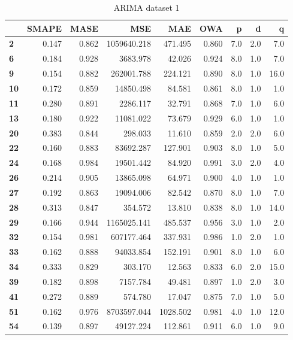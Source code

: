 \begin{table}[ht]
  \centering
  \caption{ARIMA dataset 1}
  \label{table:experiment_arima_dataset1}
  \begin{tabular}{lrrrrrrrr}
    \toprule
    {}          & SMAPE & MASE  & MSE         & MAE      & OWA   & p   & d   & q    \\
    \midrule
    \textbf{2 } & 0.147 & 0.862 & 1059640.218 & 471.495  & 0.860 & 7.0 & 2.0 & 7.0  \\
    \textbf{6 } & 0.184 & 0.928 & 3683.978    & 42.026   & 0.924 & 8.0 & 1.0 & 7.0  \\
    \textbf{9 } & 0.154 & 0.882 & 262001.788  & 224.121  & 0.890 & 8.0 & 1.0 & 16.0 \\
    \textbf{10} & 0.172 & 0.859 & 14850.498   & 84.581   & 0.861 & 8.0 & 1.0 & 1.0  \\
    \textbf{11} & 0.280 & 0.891 & 2286.117    & 32.791   & 0.868 & 7.0 & 1.0 & 6.0  \\
    \textbf{13} & 0.180 & 0.922 & 11081.022   & 73.679   & 0.929 & 6.0 & 1.0 & 1.0  \\
    \textbf{20} & 0.383 & 0.844 & 298.033     & 11.610   & 0.859 & 2.0 & 2.0 & 6.0  \\
    \textbf{22} & 0.160 & 0.883 & 83692.287   & 127.901  & 0.903 & 8.0 & 1.0 & 5.0  \\
    \textbf{24} & 0.168 & 0.984 & 19501.442   & 84.920   & 0.991 & 3.0 & 2.0 & 4.0  \\
    \textbf{26} & 0.214 & 0.905 & 13865.098   & 64.971   & 0.900 & 4.0 & 1.0 & 1.0  \\
    \textbf{27} & 0.192 & 0.863 & 19094.006   & 82.542   & 0.870 & 8.0 & 1.0 & 7.0  \\
    \textbf{28} & 0.313 & 0.847 & 354.572     & 13.810   & 0.838 & 8.0 & 1.0 & 14.0 \\
    \textbf{29} & 0.166 & 0.944 & 1165025.141 & 485.537  & 0.956 & 3.0 & 1.0 & 2.0  \\
    \textbf{32} & 0.154 & 0.981 & 607177.464  & 337.931  & 0.986 & 1.0 & 2.0 & 1.0  \\
    \textbf{33} & 0.162 & 0.888 & 94033.854   & 152.191  & 0.901 & 8.0 & 1.0 & 6.0  \\
    \textbf{34} & 0.333 & 0.829 & 303.170     & 12.563   & 0.833 & 6.0 & 2.0 & 15.0 \\
    \textbf{39} & 0.182 & 0.898 & 7157.784    & 49.481   & 0.897 & 1.0 & 2.0 & 3.0  \\
    \textbf{41} & 0.272 & 0.889 & 574.780     & 17.047   & 0.875 & 7.0 & 1.0 & 5.0  \\
    \textbf{51} & 0.162 & 0.976 & 8703597.044 & 1028.502 & 0.981 & 4.0 & 1.0 & 12.0 \\
    \textbf{54} & 0.139 & 0.897 & 49127.224   & 112.861  & 0.911 & 6.0 & 1.0 & 9.0  \\
    \bottomrule
  \end{tabular}
\end{table}
